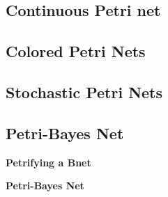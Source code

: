 \subsection{Continuous Petri net}
\subsection{Colored Petri Nets}
\subsection{Stochastic Petri Nets}
\subsection{Petri-Bayes Net}
{\bf Petrifying a Bnet}

\beq
\xymatrix@C=5pc{
\rvx
\ar[r]
&\rvy
}
\;\;\;\;\;\;
\implies
\;\;\;\;\;\;
\eeq


{\bf Petri-Bayes Net}
%

